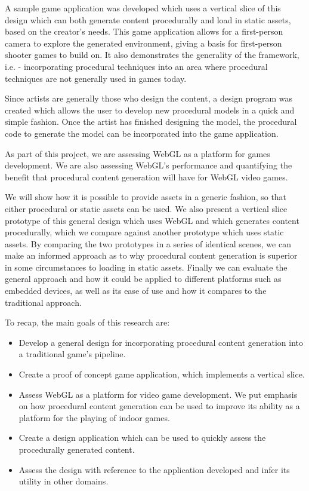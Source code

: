A sample game application was developed which uses a vertical slice of this design which can both generate content procedurally and load in static assets, based on the creator's needs.
This game application allows for a first-person camera to explore the generated environment, giving a basis for first-person shooter games to build on.
It also demonstrates the generality of the framework, i.e. - incorporating procedural techniques into an area where procedural techniques are not generally used in games today.

Since artists are generally those who design the content, a design program was created which allows the user to develop new procedural models in a quick and simple fashion.
Once the artist has finished designing the model, the procedural code to generate the model can be incorporated into the game application.

As part of this project, we are assessing WebGL as a platform for games development.
We are also assessing WebGL's performance and quantifying the benefit that procedural content generation will have for WebGL video games.

We will show how it is possible to provide assets in a generic fashion, so that either procedural or static assets can be used.
We also present a vertical slice prototype of this general design which uses WebGL and which generates content procedurally, which we compare against another prototype which uses static assets.
By comparing the two prototypes in a series of identical scenes, we can make an informed approach as to why procedural content generation is superior in some circumstances to loading in static assets.
Finally we can evaluate the general approach and how it could be applied to different platforms such as embedded devices, as well as its ease of use and how it compares to the traditional approach.

To recap, the main goals of this research are:
\begin{itemize}
	\item Develop a general design for incorporating procedural content generation into a traditional game's pipeline.
	\item Create a proof of concept game application, which implements a vertical slice.
	\item Assess WebGL as a platform for video game development. We put emphasis on how procedural content generation can be used to improve its ability as a platform for the playing of indoor games.
	\item Create a design application which can be used to quickly assess the procedurally generated content.
	\item Assess the design with reference to the application developed and infer its utility in other domains.
\end{itemize}

